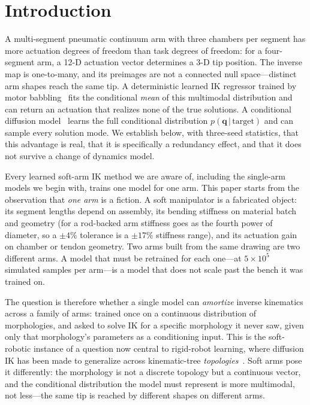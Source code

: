\documentclass[robotics,article,submit,moreauthors]{Definitions/mdpi}
\begin{document}
\section{Introduction}

A multi-segment pneumatic continuum arm with three chambers per segment has
more actuation degrees of freedom than task degrees of freedom: for a
four-segment arm, a 12-D actuation vector determines a 3-D tip position. The
inverse map is one-to-many, and its preimages are not a connected null
space---distinct arm shapes reach the same tip. A deterministic learned IK
regressor trained by motor babbling~\cite{giorelli2015neural} fits the
conditional \emph{mean} of this multimodal distribution and can return an
actuation that realizes none of the true solutions. A conditional diffusion
model~\cite{ho2020denoising,song2021denoising} learns the full conditional
distribution $p(\mathbf{q}\,|\,\text{target})$ and can sample every solution
mode. We establish below, with three-seed statistics, that this advantage is
real, that it is specifically a redundancy effect, and that it does not
survive a change of dynamics model.

Every learned soft-arm IK method we are aware of, including the single-arm
models we begin with, trains one model for one arm. This paper starts from the observation that
\emph{one arm} is a fiction. A soft manipulator is a fabricated object:
its segment lengths depend on assembly, its bending stiffness on material
batch and geometry (for a rod-backed arm stiffness goes as the fourth power
of diameter, so a $\pm4\%$ tolerance is a $\pm17\%$ stiffness range), and
its actuation gain on chamber or tendon geometry. Two arms built from the
same drawing are two different arms. A model that must be retrained for each
one---at $5\times10^5$ simulated samples per arm---is a model that does not
scale past the bench it was trained on.

The question is therefore whether a single model can \emph{amortize}
inverse kinematics across a family of arms: trained once on a continuous
distribution of morphologies, and asked to solve IK for a specific
morphology it never saw, given only that morphology's parameters as a
conditioning input. This is the soft-robotic instance of a question now
central to rigid-robot learning, where diffusion IK has been made to
generalize across kinematic-tree \emph{topologies}~\cite{zhang2025ikdiffuser,
limoyo2025generative}. Soft arms pose it differently: the morphology is not
a discrete topology but a continuous vector, and the conditional
distribution the model must represent is more multimodal, not less---the
same tip is reached by different shapes on different arms.
\end{document}
